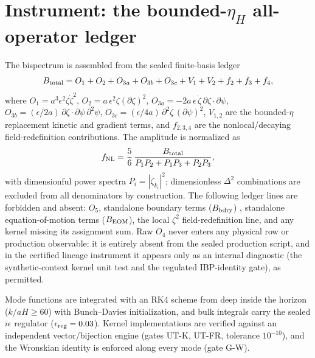 \documentclass[11pt]{article}
\begin{document}
\section{Instrument: the bounded-$\eta_H$ all-operator ledger}
\label{sec:instrument}
The bispectrum is assembled from the sealed finite-basis ledger
\begin{equation}
B_{\rm total} = O_1 + O_2 + O_{3a} + O_{3b} + O_{3c} + V_1 + V_2 + f_2 + f_3 + f_4,
\end{equation}
where $O_1 = a^3 \epsilon^2 \zeta \dot\zeta^2$,
$O_2 = a\,\epsilon^2 \zeta (\partial\zeta)^2$,
$O_{3a} = -2 a\,\epsilon\, \dot\zeta\, \partial\zeta \cdot \partial\psi$,
$O_{3b} = (\epsilon/2a)\, \partial\zeta \cdot \partial\psi\, \partial^2\psi$,
$O_{3c} = (\epsilon/4a)\, \partial^2\zeta\, (\partial\psi)^2$,
$V_{1,2}$ are the bounded-$\eta$ replacement kinetic and gradient terms, and $f_{2,3,4}$ are the
nonlocal/decaying field-redefinition contributions. The amplitude is normalized as
\begin{equation}
f_{\rm NL} = \frac{5}{6}\, \frac{B_{\rm total}}{P_1 P_2 + P_1 P_3 + P_2 P_3},
\end{equation}
with dimensionful power spectra $P_i = |\zeta_{k_i}|^2$; dimensionless $\Delta^2$ combinations are
excluded from all denominators by construction. The following ledger lines are forbidden and absent:
$O_5$, standalone boundary terms ($B_{\rm bdry}$) \cite{arroja2011}, standalone equation-of-motion
terms ($B_{\rm EOM}$), the local $\zeta^2$ field-redefinition line, and any kernel missing its
assignment sum. Raw $O_4$ never enters any physical row or production observable: it is entirely absent from
the sealed production script, and in the certified lineage instrument it appears only as an
internal diagnostic (the synthetic-context kernel unit test and the regulated IBP-identity gate),
as permitted.

Mode functions are integrated with an RK4 scheme from deep inside the horizon
($k/aH \geq 60$) with Bunch--Davies initialization, and bulk integrals carry the sealed
$i\epsilon$ regulator ($\epsilon_{\rm reg} = 0.03$). Kernel implementations are verified against an
independent vector/bijection engine (gates UT-K, UT-FR, tolerance $10^{-10}$), and the Wronskian
identity is enforced along every mode (gate G-W).
\end{document}
